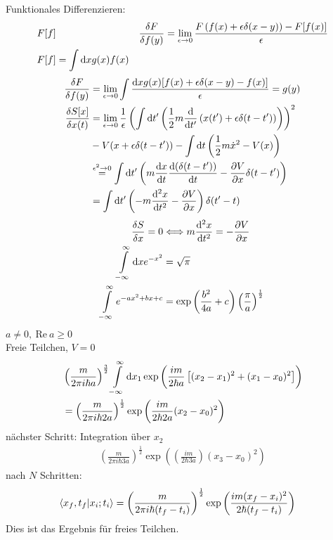 Funktionales Differenzieren:
	\begin{align*}
		F[f]& &
		\frac{\delta F}{\delta f(y)} &=
		\lim\limits_{\epsilon \rightarrow 0} 
		\frac{F\left(f(x) + \epsilon \delta(x-y)\right) - F[f(x)]}{\epsilon} \\
		F[f] &= \int \mathrm{d} x g(x) f(x) 
	\end{align*}
	\begin{align*}
		\frac{\delta F}{\delta f(y)} &= 
		\lim\limits_{\epsilon \rightarrow 0}
		\int \frac{\mathrm{d} x g(x) [f(x) + \epsilon \delta(x-y) - f(x)]}{\epsilon} 
		= g(y) \\
		\frac{\delta S[x]}{\delta x(t)} &=
		\lim\limits_{\epsilon \rightarrow 0} \frac{1}{\epsilon}
		\left(
			\int \mathrm{d} t' \left(\frac{1}{2} m \frac{\mathrm{d}}{\mathrm{d} t'} \left(x(t') + \epsilon \delta(t-t')\right)\right)
		\right)^2 \\
		&- V(x + \epsilon \delta(t-t')) - \int \mathrm{d} t \left(\frac{1}{2} m \dot{x}^2 - V(x)\right) \\
		&\overset{\epsilon^2 \rightarrow 0}{=}
		\int \mathrm{d} t'
		\left(
			m \frac{\mathrm{d} x}{\mathrm{d} t} \frac{\mathrm{d} (\delta(t-t'))}{\mathrm{d} t} 
			- \frac{\partial V}{\partial x} \delta(t-t')
		\right) \\
		&= \int \mathrm{d} t'
		\left(
			- m \frac{\mathrm{d}^2 x}{\mathrm{d} t^2} - \frac{\partial V}{\partial x}
		\right) \delta(t'- t)
	\end{align*}
	\begin{align*}
		\frac{\delta S}{\delta x} = 0 &\Longleftrightarrow 
		m \frac{\mathrm{d}^2 x}{\mathrm{d} t^2} = - \frac{\partial V}{\partial x} \\
		\int\limits_{-\infty}^\infty \mathrm{d} x e^{-x^2} &= \sqrt{\pi} \\
		\int\limits_{-\infty}^\infty e^{-ax^2 + bx + c} &=
		\exp \left(\frac{b^2}{4a} + c\right) \left(\frac{\pi}{a}\right)^{\frac{1}{2}}
	\end{align*}
$a \neq 0,~ \mathrm{Re} ~a \geq 0$ \\
Freie Teilchen, $V=0$
	\begin{align*}
		&\left(\frac{m}{2 \pi i \hbar a}\right)^{\frac{3}{2}}
		\int\limits_{-\infty}^\infty \mathrm{d} x_1 \exp 
		\left(
			\frac{im}{2\hbar a} \left[
				(x_2 - x_1)^2 + (x_1 - x_0)^2
			\right]
		\right) \\
		&= \left(\frac{m}{2\pi i \hbar 2 a}\right)^{\frac{1}{2}}
		\exp \left(
			\frac{im}{2 \hbar 2 a} (x_2 - x_0)^2
		\right)
	\end{align*}
nächster Schritt: Integration über $x_2$
	\begin{align*}
		\left(\frac{m}{2 \pi i \hbar 3 a}\right)^{\frac{1}{2}}
		\exp \left(
			\left(\frac{im}{2\hbar 3 a}\right) (x_3 - x_0)^2
		\right)
	\end{align*}
nach $N$ Schritten:
	\begin{align*}
		\braket{x_f,t_f | x_i; t_i} &=
		\left(\frac{m}{2 \pi i \hbar (t_f -t_i)}\right)^{\frac{1}{2}}
		\exp \left(\frac{im (x_f - x_i)^2}{2 \hbar (t_f - t_i)}\right)
	\end{align*}
Dies ist das Ergebnis für freies Teilchen.

